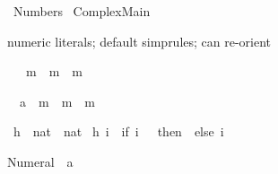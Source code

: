 %
\begin{isabellebody}%
\def\isabellecontext{Numbers}%
%
\isadelimtheory
%
\endisadelimtheory
%
\isatagtheory
{}\isamarkupfalse%
\ Numbers\isanewline
{}\ Complex{}Main\isanewline
{}%
\endisatagtheory
{\isafoldtheory}%
%
\isadelimtheory
%
\endisadelimtheory
%
\begin{isamarkuptext}%
numeric literals; default simprules; can re-orient%
\end{isamarkuptext}%
\isamarkuptrue%
\isamarkupfalse%
\ {}{}\ {}\ m\ {}\ m\ {}\ m{}%
\isadelimproof
%
\endisadelimproof
%
\isatagproof
%
\begin{isamarkuptxt}%
\begin{isabelle}%
\ {}{}\ {}{}{}{}a{}\ {}\ m\ {}\ m\ {}\ m%
\end{isabelle}%
\end{isamarkuptxt}%
\isamarkuptrue%
\isamarkupfalse%
%
\endisatagproof
{\isafoldproof}%
%
\isadelimproof
%
\endisadelimproof
\isanewline
\isanewline
{}\isamarkupfalse%
\ h\ {}{}\ {}nat\ {}\ nat{}\ \isanewline
{}h\ i\ {}\ {}if\ i\ {}\ {}\ then\ {}\ else\ i{}{}%
\begin{isamarkuptext}%
%
\end{isamarkuptext}%
\isamarkuptrue%
%
\begin{isamarkuptext}%
\begin{isabelle}%
Numeral{}\ {}\ {}{}{}{}a{}%
\end{isabelle}


\end{isamarkuptext}
\end{isabellebody}
